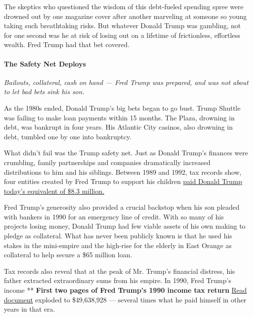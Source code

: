 The skeptics who questioned the wisdom of this debt-fueled spending
spree were drowned out by one magazine cover after another marveling at
someone so young taking such breathtaking risks. But whatever Donald
Trump was gambling, not for one second was he at risk of losing out on a
lifetime of frictionless, effortless wealth. Fred Trump had that bet
covered.

\hypertarget{the-safety-net-deploys}{%
\paragraph{The Safety Net Deploys}\label{the-safety-net-deploys}}

\emph{Bailouts, collateral, cash on hand --- Fred Trump was prepared,
and was not about to let bad bets sink his son.}

As the 1980s ended, Donald Trump's big bets began to go bust. Trump
Shuttle was failing to make loan payments within 15 months. The Plaza,
drowning in debt, was bankrupt in four years. His Atlantic City casinos,
also drowning in debt, tumbled one by one into bankruptcy.

What didn't fail was the Trump safety net. Just as Donald Trump's
finances were crumbling, family partnerships and companies dramatically
increased distributions to him and his siblings. Between 1989 and 1992,
tax records show, four entities created by Fred Trump to support his
children
\href{https://int.nyt.com/data/documenthelper/341-djt-k1-1991-1993/2ed81084d70858cfbb17/optimized/full.pdf\#page=1}{paid
Donald Trump today's equivalent of \$8.3 million.}

Fred Trump's generosity also provided a crucial backstop when his son
pleaded with bankers in 1990 for an emergency line of credit. With so
many of his projects losing money, Donald Trump had few viable assets of
his own making to pledge as collateral. What has never been publicly
known is that he used his stakes in the mini-empire and the high-rise
for the elderly in East Orange as collateral to help secure a \$65
million loan.

Tax records also reveal that at the peak of Mr. Trump's financial
distress, his father extracted extraordinary sums from his empire. In
1990, Fred Trump's income ** \textbf{First two pages of Fred Trump's
1990 income tax return}
\href{https://int.nyt.com/data/documenthelper/192-fct-1040-1990/f3b877329915ee2c4602/optimized/full.pdf\#page=1}{Read
document} exploded to \$49,638,928 --- several times what he paid
himself in other years in that era.

